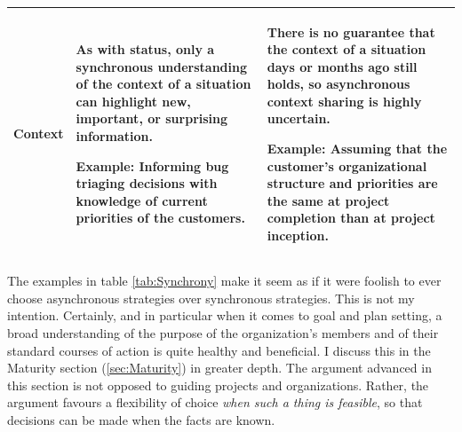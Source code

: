 \begin{table}[tbp]
{\begin{tabular}{p{2.0cm}p{5.8cm}p{5.8cm}}
\hline
\vspace{0.5pt} Context & \vspace{0.5pt} As with status, only a synchronous understanding of the context of a situation can highlight new, important, or surprising information. \par Example: Informing bug triaging decisions with knowledge of current priorities of the customers. & \vspace{0.5pt} There is no guarantee that the context of a situation days or months ago still holds, so asynchronous context sharing is highly uncertain. \par Example: Assuming that the customer's organizational structure and priorities are the same at project completion than at project inception.\\
\hline
\end{tabular}}
\end{table}

The examples in table \ref{tab:Synchrony} make it seem as if it were foolish to ever choose asynchronous strategies over synchronous strategies. This is not my intention. Certainly, and in particular when it comes to goal and plan setting, a broad understanding of the purpose of the organization's members and of their standard courses of action is quite healthy and beneficial. I discuss this in the Maturity section (\ref{sec:Maturity}) in greater depth. The argument advanced in this section is not opposed to guiding projects and organizations. Rather, the argument favours a flexibility of choice \emph{when such a thing is feasible}, so that decisions can be made when the facts are known.

